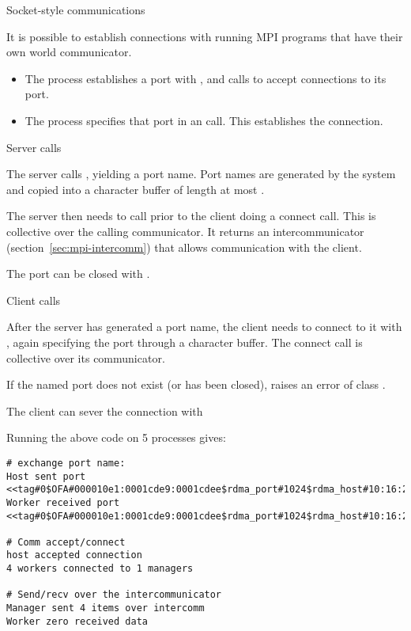  {Socket-style communications}

It is possible to establish connections with running MPI programs that
have their own world communicator.
\begin{itemize}
\item The  process establishes a port with 
  , and calls  to accept
  connections to its port.
\item The  process specifies that port 
  in an  call. This establishes the connection.
\end{itemize}

 {Server calls}

The server calls , yielding a port name.
Port names are generated by the system and copied into a character
buffer of length at most .

The server then needs to call 
 prior to the client doing a connect call.
This is collective over the calling communicator.
It returns an intercommunicator (section~\ref{sec:mpi-intercomm})
that allows communication with the client.


The port can be closed with 
.

 {Client calls}

After the server has generated a port name, the client 
needs to connect to it with
, again specifying the port through a character buffer.
The connect call is collective over its communicator.


If the named port does not exist (or has been closed),
 raises an error of class .

The client can sever the connection with

Running the above code on 5 processes gives:
\begin{small}
\begin{verbatim}
# exchange port name:
Host sent port <<tag#0$OFA#000010e1:0001cde9:0001cdee$rdma_port#1024$rdma_host#10:16:225:0:1:205:199:254:128:0:0:0:0:0:0$>>
Worker received port <<tag#0$OFA#000010e1:0001cde9:0001cdee$rdma_port#1024$rdma_host#10:16:225:0:1:205:199:254:128:0:0:0:0:0:0$>>

# Comm accept/connect
host accepted connection
4 workers connected to 1 managers

# Send/recv over the intercommunicator
Manager sent 4 items over intercomm
Worker zero received data  
\end{verbatim}
\end{small}


